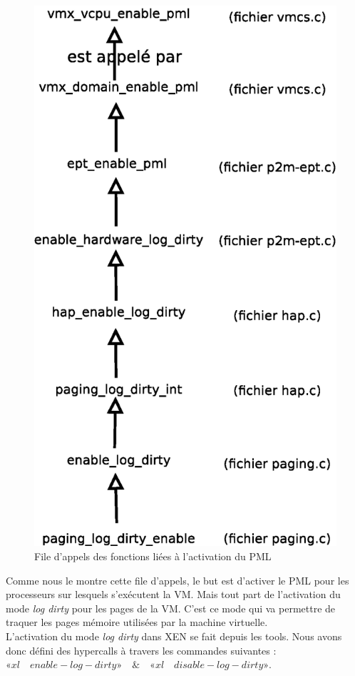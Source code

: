 \begin{figure}[H]
    \centering
    \includegraphics[scale=.6]{chapters/4/fig4/appel_fonction}
    \caption{File d'appels des fonctions liées à l'activation du PML}
    \label{fig:appel_fonction}
\end{figure}

\noindent Comme nous le montre cette file d'appels, le but est d'activer le PML pour les processeurs sur lesquels s'exécutent la VM. Mais tout part de l'activation du mode \textit{log dirty} pour les pages de la VM. C'est ce mode qui va permettre de traquer les pages mémoire utilisées par la machine virtuelle.\\
L'activation du mode \textit{log dirty} dans XEN se fait depuis les tools. Nous avons donc défini des hypercalls à travers les commandes suivantes : $«xl \quad enable-log-dirty» \quad \& \quad  «xl \quad disable-log-dirty»$.

